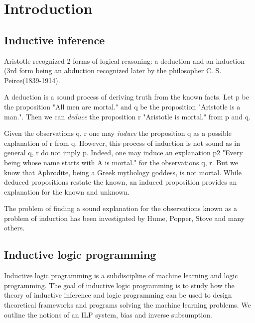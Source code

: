 
\chapter{Introduction}


\section{Inductive inference}
Aristotle recognized 2 forms of logical reasoning: a deduction and an induction\cite{sep-aristotle-logic} (3rd form being an abduction recognized later by the philosopher C. S. Peirce(1839-1914)\cite{kimber2012learning}\cite{peirce1935collected}.

A deduction is a sound process of deriving truth from the known facts. Let p be the proposition "All men are mortal." and q be the proposition "Aristotle is a man.". Then we can \emph{deduce} the proposition r "Aristotle is mortal." from p and q.

Given the observations q, r one may \emph{induce} the proposition q as a possible explanation of r from q. However, this process of induction is not sound as in general q, r do not imply p. Indeed, one may induce an explanation p2 "Every being whose name starts with A is mortal." for the observations q, r. But we know that Aphrodite, being a Greek mythology goddess, is not mortal. While  deduced propositions restate the known, an induced proposition provides an explanation for the known and unknown.

The problem of finding a sound explanation for the observations known as a problem of induction has been investigated by Hume\cite{hume1902enquiries}\cite{selby1888treatise}, Popper\cite{keuth2013karl}, Stove\cite{stove1986rationality} and many others.

\section{Inductive logic programming}\cite{muggleton1995inverse}\cite{nienhuys1997foundations}
Inductive logic programming is a subdiscipline of machine learning and logic programming. The goal of inductive logic programming is to study how the theory of inductive inference and logic programming can be used to design theoretical frameworks and programs solving the machine learning problems. We outline the notions of an ILP system, bias and inverse subsumption.

